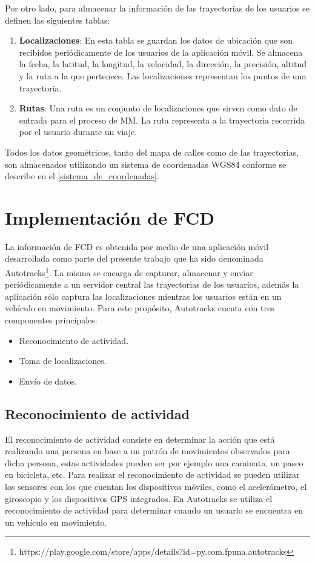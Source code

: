 Por otro lado, para almacenar la información de las trayectorias de los usuarios se definen las siguientes tablas:
\begin{enumerate}
\item \textbf{Localizaciones}: En esta tabla se guardan los datos de ubicación que son recibidos periódicamente de los usuarios de la aplicación móvil. Se almacena la fecha, la latitud, la longitud, la velocidad, la dirección, la precisión, altitud y la ruta a la que pertenece. Las localizaciones representan los puntos de una trayectoria.
\item \textbf{Rutas}: Una ruta es un conjunto de localizaciones que sirven como dato de entrada para el proceso de MM. La ruta representa a la trayectoria recorrida por el usuario durante un viaje.
\end{enumerate}

Todos los datos geométricos, tanto del mapa de calles como de las trayectorias, son almacenados utilizando un sistema de coordenadas WGS84 conforme se describe en el \cref{sistema_de_coordenadas}.

\section{Implementación de FCD}
\label{floating-car-data}

La información de FCD es obtenida por medio de una aplicación móvil desarrollada como parte del presente trabajo que ha sido denominada Autotracks\footnote{https://play.google.com/store/apps/details?id=py.com.fpuna.autotracks}. La misma se encarga de capturar, almacenar y enviar periódicamente a un servidor central las trayectorias de los usuarios, además la aplicación sólo captura las localizaciones mientras los usuarios están en un vehículo en movimiento. Para este propósito, Autotracks cuenta con tres componentes principales: 
\begin{itemize}
	\item Reconocimiento de actividad.
	\item Toma de localizaciones.
	\item Envío de datos.
\end{itemize}

\subsection{Reconocimiento de actividad}
\label{reconocimiento_actividad}

El reconocimiento de actividad consiste en determinar la acción que está realizando una persona en base a un patrón de movimientos observados para dicha persona, estas actividades pueden ser por ejemplo una caminata, un paseo en bicicleta, etc. Para realizar el reconocimiento de actividad se pueden utilizar los sensores con los que cuentan los dispositivos móviles, como el acelerómetro, el giroscopio y los dispositivos GPS integrados. En Autotracks se utiliza el reconocimiento de actividad para determinar cuando un usuario se encuentra en un vehículo en movimiento.


